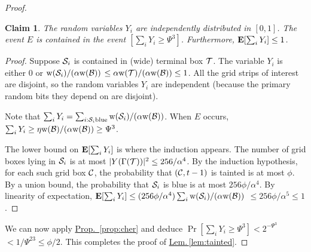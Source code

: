 \documentclass{acmsmall}
\newtheorem{claim}[theorem]{Claim}
\newcommand{\cB}{{\cal B}}
\newcommand{\cC}{{\cal C}}
\newcommand{\cS}{{\cal S}}
\newcommand{\cT}{{\cal T}}
\newcommand{\Lem}[1]{\hyperref[lem:#1]{Lem.\,\ref*{lem:#1}}} %
\newcommand{\Prop}[1]{\hyperref[prop:#1]{Prop.~\ref*{prop:#1}}} %
\newcommand{\taint}{\eta}
\newcommand{\taintprob}{\phi}
\newcommand{\EX}{\hbox{\bf E}}
\newcommand{\width}{{\bf {\rm  w}}}
\newcommand{\gridprec}{\alpha}
\newcommand{\errorcont}{\Psi}
\begin{document}
\begin{proof}
\begin{claim} \label{clm:yi} The random variables $Y_i$ are independently distributed in $[0,1]$.
The event $E$ is contained in the event $[\sum_i Y_i \geq \errorcont^3]$.
Furthermore, $\EX[\sum_i Y_i] \leq 1$. 
\end{claim}

\begin{proof} Suppose $\cS_i$ is contained in (wide) terminal box $\cT$.
The variable $Y_i$ is either $0$ or $ \width(\cS_i)/(\gridprec \width(\cB))$ $\leq \gridprec \width(\cT)/(\gridprec \width(\cB))
\leq 1$. All the grid strips of interest are disjoint,  so the random variables $Y_i$
are independent (because the primary random bits they depend on are disjoint).

Note that $\sum_i Y_i = \sum_{i: \cS_i \textrm{blue}} \width(\cS_i)/(\gridprec \width(\cB))$.
When $E$ occurs, $\sum_i Y_i \geq \taint \width(\cB)/(\gridprec \width(\cB)) \geq \errorcont^3$.

The lower bound on $\EX[\sum_i Y_i]$ is where the  induction appears.
The number of grid boxes lying in $\cS_i$ is at most $|Y(\Gamma(\cT))|^2 \leq 256/\gridprec^4$.  By the induction hypothesis,
for each such grid box $\cC$, the probability that $(\cC,t-1)$ is tainted is at most $\taintprob$.
By a union bound, the probability that $\cS_i$ is blue is at most $256 \taintprob/\gridprec^4$.
By linearity of expectation, $\EX[\sum_i Y_i] \leq (256 \taintprob/\gridprec^4)\sum_i \width(\cS_i)/(\gridprec \width(\cB))$
$\leq 256\taintprob/\gridprec^5 \leq 1$.
\end{proof}
%
We can now apply \Prop{cher} and deduce
$\Pr[\sum_i Y_i \geq {\errorcont}^3] < 2^{-\errorcont^3}$ $< 1/\errorcont^{23} \leq \taintprob/2$.
This completes the proof of \Lem{tainted}.
\end{proof}
%
%
%
%
%
\end{document}
